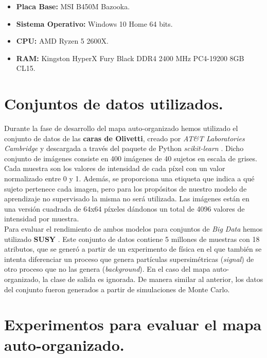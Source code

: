 \begin{itemize}
	\item \textbf{Placa Base:} MSI B450M Bazooka.
	\item \textbf{Sistema Operativo:} Windows 10 Home 64 bits.
	\item \textbf{CPU:} AMD Ryzen 5 2600X.
	\item \textbf{RAM:} Kingston HyperX Fury Black DDR4 2400 MHz PC4-19200 8GB CL15.
\end{itemize}
\section{Conjuntos de datos utilizados.}

Durante la fase de desarrollo del mapa auto-organizado hemos utilizado el conjunto de datos de las \textbf{caras de Olivetti}, creado por \textit{AT\&T Laboratories Cambridge} y descargada a través del paquete de Python \textit{scikit-learn} \cite{olivetti}. Dicho conjunto de imágenes consiste en 400 imágenes de 40 sujetos en escala de grises. Cada muestra son los valores de intensidad de cada píxel con un valor normalizado entre 0 y 1. Además, se proporciona una etiqueta que indica a qué sujeto pertenece cada imagen, pero para los propósitos de nuestro modelo de aprendizaje no supervisado la misma no será utilizada. Las imágenes están en una versión cuadrada de 64x64 píxeles dándonos un total de 4096 valores de intensidad por muestra. \\


Para evaluar el rendimiento de ambos modelos para conjuntos de \textit{Big Data} hemos utilizado \textbf{SUSY} \cite{susy}. Este conjunto de datos contiene 5 millones de muestras con 18 atributos, que se generó a partir de un experimento de física en el que también se intenta diferenciar un proceso que genera partículas supersimétricas (\textit{signal}) de otro proceso que no las genera (\textit{background}). En el caso del mapa auto-organizado, la clase de salida es ignorada. De manera similar al anterior, los datos del conjunto fueron generados a partir de simulaciones de Monte Carlo.


\section{Experimentos para evaluar el mapa auto-organizado.}
